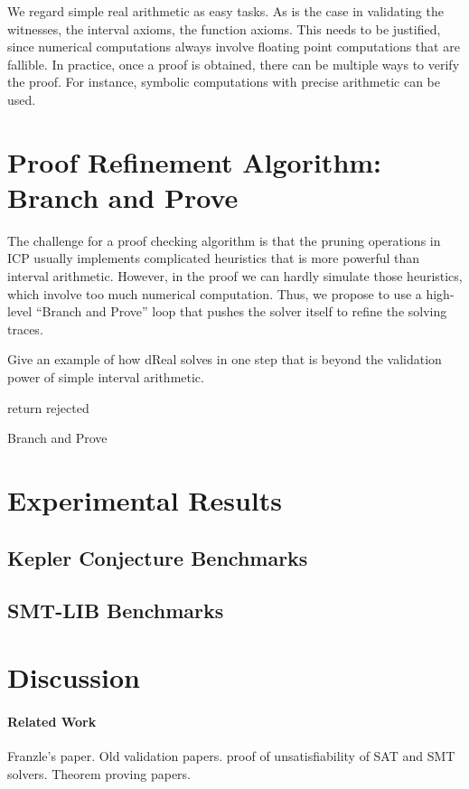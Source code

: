 \documentclass[envcountsect]{llncs}
\begin{document}
\begin{remark}
We regard simple real arithmetic as easy tasks.
As is the case in validating the witnesses, the interval axioms, the function
axioms. This needs to be justified, since numerical computations always involve
floating point computations that are fallible. In practice, once a proof is
obtained, there can be multiple ways to verify the proof. For instance, symbolic
computations with precise arithmetic can be used.
\end{remark}

\section{Proof Refinement Algorithm: Branch and Prove}

The challenge for a proof checking algorithm is that the pruning operations in
ICP usually implements complicated heuristics that is more powerful than
interval arithmetic. However, in the proof we can hardly simulate those
heuristics, which involve too much numerical computation. Thus, we propose to use
a high-level ``Branch and Prove'' loop that pushes the solver itself to refine
the solving traces.

\begin{example}
Give an example of how dReal solves in one step that is beyond the validation
power of simple interval arithmetic.
\end{example}

\begin{algorithm}\label{algo1}
\BlankLine
{}
return {\sf rejected}\;
\caption{Branch and Prove}
\end{algorithm}


\section{Experimental Results}

\subsection{Kepler Conjecture Benchmarks}

\subsection{SMT-LIB Benchmarks}

\section{Discussion}

\paragraph{Related Work}
Franzle's paper. Old validation papers. proof of unsatisfiability of SAT and
SMT solvers. Theorem proving papers.




\end{document}
